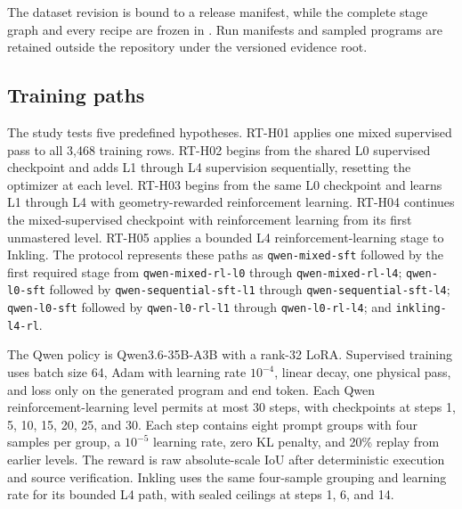 The dataset revision is bound to a release manifest, while the complete
stage graph and every recipe are frozen in
. Run manifests
and sampled programs are retained outside the repository under the
versioned  evidence root.

\subsection{Training paths}

The study tests five predefined hypotheses. RT-H01 applies one mixed
supervised pass to all 3{,}468 training rows. RT-H02 begins from the shared
L0 supervised checkpoint and adds L1 through L4 supervision sequentially,
resetting the optimizer at each level. RT-H03 begins from the same L0
checkpoint and learns L1 through L4 with geometry-rewarded reinforcement
learning. RT-H04 continues the mixed-supervised checkpoint with reinforcement
learning from its first unmastered level. RT-H05 applies a bounded L4
reinforcement-learning stage to Inkling. The protocol represents these paths
as \texttt{qwen-mixed-sft} followed by the first required stage from
\texttt{qwen-mixed-rl-l0} through \texttt{qwen-mixed-rl-l4};
\texttt{qwen-l0-sft} followed by
\texttt{qwen-sequential-sft-l1} through
\texttt{qwen-sequential-sft-l4}; \texttt{qwen-l0-sft} followed by
\texttt{qwen-l0-rl-l1} through \texttt{qwen-l0-rl-l4}; and
\texttt{inkling-l4-rl}.

The Qwen policy is Qwen3.6-35B-A3B with a rank-32 LoRA. Supervised training
uses batch size 64, Adam with learning rate $10^{-4}$, linear decay, one
physical pass, and loss only on the generated program and end token. Each
Qwen reinforcement-learning level permits at most 30 steps, with checkpoints
at steps 1, 5, 10, 15, 20, 25, and 30. Each step contains eight prompt groups
with four samples per group, a $10^{-5}$ learning rate, zero KL penalty, and
20\% replay from earlier levels. The reward is raw absolute-scale IoU after
deterministic execution and source verification. Inkling uses the same
four-sample grouping and learning rate for its bounded L4 path, with sealed
ceilings at steps 1, 6, and 14.

